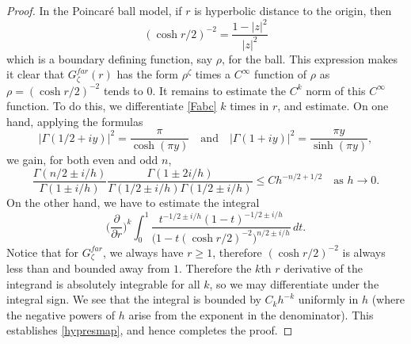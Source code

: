 \documentclass[10pt, a4paper, twoside]{amsart}
\numberwithin{equation}{section}
\theoremstyle{remark}
\begin{document}
\begin{proof}
 
 In the Poincar\'e ball model, if $r$ is hyperbolic distance to the origin, then 
 $$(\cosh r/2)^{-2} = \frac{1-|z|^2}{|z|^2}
 $$
 which is a boundary defining function, say $\rho$, for the ball. This expression makes it clear that $G_\zeta^{far}(r)$ has the form $\rho^{\zeta}$ times a $C^\infty$ function of $\rho$ as $\rho = (\cosh r/2)^{-2}$ tends to $0$. It remains to estimate the $C^k$ norm of this $C^\infty$ function. To do this, we differentiate \eqref{Fabc} $k$ times in $r$, and estimate. 
On one hand, applying the formulas $$|\Gamma(1/2 + iy)|^2 = \frac{\pi}{\cosh (\pi y)}  \quad \mbox{and} \quad |\Gamma(1 + iy)|^2 = \frac{\pi y}{\sinh (\pi y)},$$ we gain, for both even and odd $n$, \begin{equation}\label{eqn: coefficient of hypergeometric function}\frac{\Gamma(n/2 \pm i/h)}{\Gamma(1 \pm i/h)} \frac{\Gamma(1 \pm 2i/h)}{\Gamma(1/2 \pm i/h) \Gamma(1/2 \pm i/h)} \leq C h^{-n/2 + 1/2} \quad \mbox{as $h \rightarrow 0$.}\end{equation}
On the other hand, we have to estimate the integral $$ \big( \frac{\partial}{\partial r} \big)^k \int_0^1 \frac{t^{-1/2 \pm i/h} (1 - t)^{-1/2 \pm i/h}}{\big(1 - t(\cosh r/2)^{-2})^{n/2 \pm i/h}} \,dt.$$  
Notice that for $G_\zeta^{far}$, we always have $r \geq 1$, therefore $(\cosh r/2)^{-2}$ is always less than and bounded away from $1$. Therefore the $k$th $r$ derivative of the integrand is absolutely integrable for all $k$, so we may differentiate under the integral sign. We see that the integral is bounded by $C_k h^{-k}$ uniformly in $h$ (where the negative powers of $h$ arise from the exponent in the denominator). This establishes \eqref{hypresmap}, and hence completes the proof.  
\end{proof}

 
\end{document}

